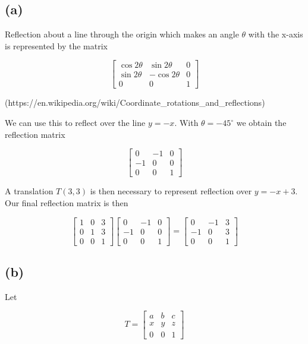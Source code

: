 \documentclass[paper=a4, fontsize=11pt]{scrartcl} %
\numberwithin{equation}{section} %
\numberwithin{figure}{section} %
\numberwithin{table}{section} %
\begin{document}
\subsection*{(a)}

Reflection about a line through the origin which makes an angle $\theta$ with the
x-axis is represented by the matrix

\[
  \begin{bmatrix}
    \cos{2\theta} & \sin{2\theta} & 0 \\
    \sin{2\theta} & -\cos{2\theta} & 0 \\
    0 & 0 & 1
  \end{bmatrix}
\]

(https://en.wikipedia.org/wiki/Coordinate\_rotations\_and\_reflections)

We can use this to reflect over the line $y = -x$. With $\theta = -45^\circ$ we
obtain the reflection matrix

\[
  \begin{bmatrix}
    0 & -1 & 0 \\
    -1 & 0 & 0 \\
    0 & 0 & 1
  \end{bmatrix}
\]

A translation $T(3, 3)$ is then necessary to represent reflection over $y = -x +
3$. Our final reflection matrix is then

\[
  \begin{bmatrix}
    1 & 0 & 3 \\
    0 & 1 & 3 \\
    0 & 0 & 1
  \end{bmatrix}
  \begin{bmatrix}
    0 & -1 & 0 \\
    -1 & 0 & 0 \\
    0 & 0 & 1
  \end{bmatrix}
  =
  \begin{bmatrix}
    0 & -1 & 3 \\
    -1 & 0 & 3 \\
    0 & 0 & 1
  \end{bmatrix}
\]

\subsection*{(b)}

Let

\[
  T = 
  \begin{bmatrix}
    a & b & c \\
    x & y & z \\
    0 & 0 & 1
  \end{bmatrix}
\]
\end{document}
